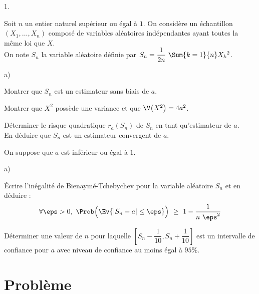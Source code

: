 \documentclass[11pt]{article}%
\begin{document}


\begin{noliste}{1.}
  \setcounter{enumi}{5} %
  \setlength{\itemsep}{4mm}
\item Soit $n$ un entier naturel supérieur ou égal à $1$. On considère
  un échantillon $(X_1, \ldots, X_n)$ composé de variables aléatoires
  indépendantes ayant toutes la même loi que $X$.\\
  On note $S_n$ la variable aléatoire définie par $S_n = \dfrac{1}{2n}
  \ \Sum{k=1}{n} X_k{}^2$.

  \begin{noliste}{a)}
    \setlength{\itemsep}{2mm}
  \item Montrer que $S_n$ est un estimateur sans biais de $a$.

    

  \item Montrer que $X^2$ possède une variance et que $\V\big(X^2\big)
    = 4a^2$.

    

  \item Déterminer le risque quadratique $r_a(S_n)$ de $S_n$ en tant
    qu'estimateur de $a$.\\
    En déduire que $S_n$ est un estimateur convergent de $a$.

    
  \end{noliste}

\item On suppose que $a$ est inférieur ou égal à $1$.
  \begin{noliste}{a)}
    \setlength{\itemsep}{2mm}
  \item Écrire l'inégalité de Bienaymé-Tchebychev pour la variable
    aléatoire $S_n$ et en déduire :
    \[
    \forall \eps > 0, \ \Prob\Big(\Ev{|S_n - a| \leq \eps} \Big) \
    \geq \ 1 - \dfrac{1}{n \ \eps^2}
    \]
    
    
    



  \item Déterminer une valeur de $n$ pour laquelle $\left[ S_n -
      \dfrac{1}{10}, S_n + \dfrac{1}{10}\right]$ est un intervalle de
    confiance pour $a$ avec niveau de confiance au moins égal à
    $95\%$.

    
  \end{noliste}
\end{noliste}




\section*{Problème}
\end{document}

